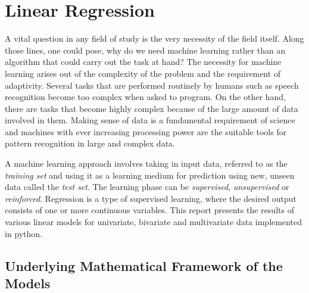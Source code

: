 \section*{Linear Regression}

A vital question in any field of study is the very necessity of the field itself. Along those lines, one could pose, why do we need machine learning rather than an algorithm that could carry out the task at hand? The necessity for machine learning arises out of the complexity of the problem and the requirement of adaptivity. Several tasks that are performed routinely by humans such as speech recognition become too complex when asked to program. On the other hand, there are tasks that become highly complex because of the large amount of data involved in them. Making sense of data is a fundamental requirement of science and machines with ever increasing processing power are the suitable tools for pattern recognition in large and complex data. 

A machine learning approach involves taking in input data, referred to as the \textit{training set} and using it as a learning medium for prediction using new, unseen data called the \textit{test set}. The learning phase can be \textit{supervised}, \textit{unsupervised} or \textit{reinforced}. Regression is a type of supervised learning, where the desired output consists of one or more continuous variables. This report presents the results of various linear models for univariate, bivariate and multivariate data implemented in python.

\subsection*{Underlying Mathematical Framework of the Models}

